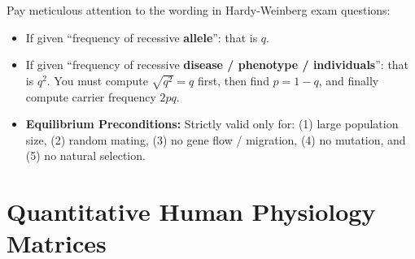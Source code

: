 \documentclass[10pt,twoside,openright]{book}
\begin{document}
\begin{trapbox}
Pay meticulous attention to the wording in Hardy-Weinberg exam questions:
\begin{itemize}
  \item If given ``frequency of recessive \textbf{allele}'': that is $q$.
  \item If given ``frequency of recessive \textbf{disease / phenotype / individuals}'': that is $q^2$. You must compute $\sqrt{q^2} = q$ first, then find $p = 1 - q$, and finally compute carrier frequency $2pq$.
  \item \textbf{Equilibrium Preconditions:} Strictly valid only for: (1) large population size, (2) random mating, (3) no gene flow / migration, (4) no mutation, and (5) no natural selection.
\end{itemize}
\end{trapbox}

\section{Quantitative Human Physiology Matrices}
\end{document}
